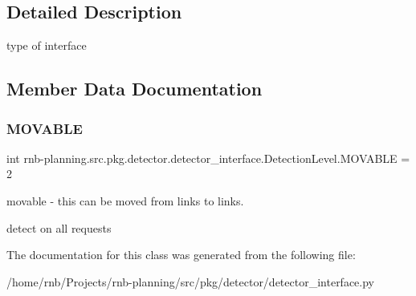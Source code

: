 \subsection{Detailed Description}
type of interface 

\subsection{Member Data Documentation}
\mbox{\label{classrnb-planning_1_1src_1_1pkg_1_1detector_1_1detector__interface_1_1_detection_level_a8f69b4736ec3eeafd95a3ae9d612d757}} 
\subsubsection{\texorpdfstring{M\+O\+V\+A\+B\+LE}{MOVABLE}}
{\footnotesize\ttfamily int rnb-\/planning.\+src.\+pkg.\+detector.\+detector\+\_\+interface.\+Detection\+Level.\+M\+O\+V\+A\+B\+LE = 2\hspace{0.3cm}{\ttfamily [static]}}



movable -\/ this can be moved from links to links. 

detect on all requests 

The documentation for this class was generated from the following file\+:\begin{DoxyCompactItemize}
\item 
/home/rnb/\+Projects/rnb-\/planning/src/pkg/detector/detector\+\_\+interface.\+py\end{DoxyCompactItemize}

